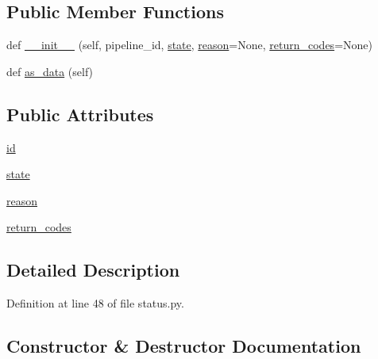\subsection*{Public Member Functions}
\begin{DoxyCompactItemize}
\item 
def \hyperlink{classcodar_1_1savanna_1_1status_1_1_pipeline_state_aad524111d3971ff923bbe0fb1846d2e0}{\+\_\+\+\_\+init\+\_\+\+\_\+} (self, pipeline\+\_\+id, \hyperlink{classcodar_1_1savanna_1_1status_1_1_pipeline_state_a88ffca97c0ff1a0f41874cbeb60b90d3}{state}, \hyperlink{classcodar_1_1savanna_1_1status_1_1_pipeline_state_ac5a9c042a32b7e3201392bdc680ef42e}{reason}=None, \hyperlink{classcodar_1_1savanna_1_1status_1_1_pipeline_state_a5c8ed429b9840e57e11bf69eaa18c9c8}{return\+\_\+codes}=None)
\item 
def \hyperlink{classcodar_1_1savanna_1_1status_1_1_pipeline_state_a6bc3b110734ec87c57ea209e8e34a1de}{as\+\_\+data} (self)
\end{DoxyCompactItemize}
\subsection*{Public Attributes}
\begin{DoxyCompactItemize}
\item 
\hyperlink{classcodar_1_1savanna_1_1status_1_1_pipeline_state_a84555aff70ced0a148ecb0b19d9421e3}{id}
\item 
\hyperlink{classcodar_1_1savanna_1_1status_1_1_pipeline_state_a88ffca97c0ff1a0f41874cbeb60b90d3}{state}
\item 
\hyperlink{classcodar_1_1savanna_1_1status_1_1_pipeline_state_ac5a9c042a32b7e3201392bdc680ef42e}{reason}
\item 
\hyperlink{classcodar_1_1savanna_1_1status_1_1_pipeline_state_a5c8ed429b9840e57e11bf69eaa18c9c8}{return\+\_\+codes}
\end{DoxyCompactItemize}


\subsection{Detailed Description}


Definition at line 48 of file status.\+py.



\subsection{Constructor \& Destructor Documentation}
\mbox{\label{classcodar_1_1savanna_1_1status_1_1_pipeline_state_aad524111d3971ff923bbe0fb1846d2e0}} 
